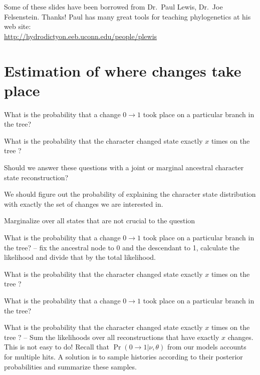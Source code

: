 \documentclass[landscape]{foils}
\begin{document}
\pagecolor{white}
\unitlength=1mm
\begin{center}
{\Large Some of these slides have been borrowed from Dr.\ Paul Lewis, Dr.\ Joe Felsenstein. Thanks!}
\vskip 15mm
\large Paul has many great tools for teaching phylogenetics at his web site: \\
\url{http://hydrodictyon.eeb.uconn.edu/people/plewis}
\end{center}




\myNewSlide


\myNewSlide
\section*{Estimation of where changes take place}
\large
\begin{compactenum}
	\item What is the probability that a change $0\rightarrow1$ took place on a particular branch in the tree?
	\item What is the probability that the character changed state exactly $x$ times on the tree ?  
\end{compactenum}

Should we answer these questions with a joint or marginal ancestral character state reconstruction?

\myNewSlide
\Huge
{}


\myNewSlide
\large
We should figure out the probability of explaining the character state distribution with exactly the set of changes we are interested in.

Marginalize over all states that are not crucial to the question

\myNewSlide
\begin{compactenum}
	\item What is the probability that a change $0\rightarrow1$ took place on a particular branch in the tree? -- fix the ancestral node to 0 and the descendant to 1, calculate the likelihood and divide that by the total likelihood.
	\item {\color{grey}What is the probability that the character changed state exactly $x$ times on the tree ?  }
\end{compactenum}

\myNewSlide
\begin{compactenum}
	\item {\color{grey}What is the probability that a change $0\rightarrow1$ took place on a particular branch in the tree?}
	\item What is the probability that the character changed state exactly $x$ times on the tree ?  -- Sum the likelihoods over all reconstructions that have exactly $x$ changes.  This is not easy to do!  Recall that $\Pr(0\rightarrow 1|\nu,\theta)$ from our models accounts for multiple hits.  A solution is to sample histories according to their posterior probabilities and summarize these samples.
\end{compactenum}
\end{document}
